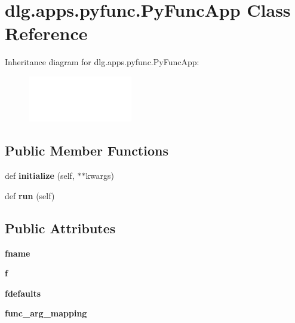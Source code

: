 \hypertarget{classdlg_1_1apps_1_1pyfunc_1_1_py_func_app}{}\section{dlg.\+apps.\+pyfunc.\+Py\+Func\+App Class Reference}
\label{classdlg_1_1apps_1_1pyfunc_1_1_py_func_app}
Inheritance diagram for dlg.\+apps.\+pyfunc.\+Py\+Func\+App\+:\begin{figure}[H]
\begin{center}
\leavevmode
\includegraphics[height=2.000000cm]{classdlg_1_1apps_1_1pyfunc_1_1_py_func_app}
\end{center}
\end{figure}
\subsection*{Public Member Functions}
\begin{DoxyCompactItemize}
\item 
\mbox{\label{classdlg_1_1apps_1_1pyfunc_1_1_py_func_app_ab8f5deb7480cfb37e3a6c1b3cc3dd899}} 
def {\bfseries initialize} (self, $\ast$$\ast$kwargs)
\item 
\mbox{\label{classdlg_1_1apps_1_1pyfunc_1_1_py_func_app_a3bef5efee1e75d51576bfab8f0827510}} 
def {\bfseries run} (self)
\end{DoxyCompactItemize}
\subsection*{Public Attributes}
\begin{DoxyCompactItemize}
\item 
\mbox{\label{classdlg_1_1apps_1_1pyfunc_1_1_py_func_app_a03ad0c702a860a2fa288d1808541eb72}} 
{\bfseries fname}
\item 
\mbox{\label{classdlg_1_1apps_1_1pyfunc_1_1_py_func_app_a7438787d9ee13937c06d11564bfee011}} 
{\bfseries f}
\item 
\mbox{\label{classdlg_1_1apps_1_1pyfunc_1_1_py_func_app_a080673779ad6eb8c93e95d8e36c35829}} 
{\bfseries fdefaults}
\item 
\mbox{\label{classdlg_1_1apps_1_1pyfunc_1_1_py_func_app_a080923905de609d2db956425deea26cf}} 
{\bfseries func\+\_\+arg\+\_\+mapping}
\end{DoxyCompactItemize}


